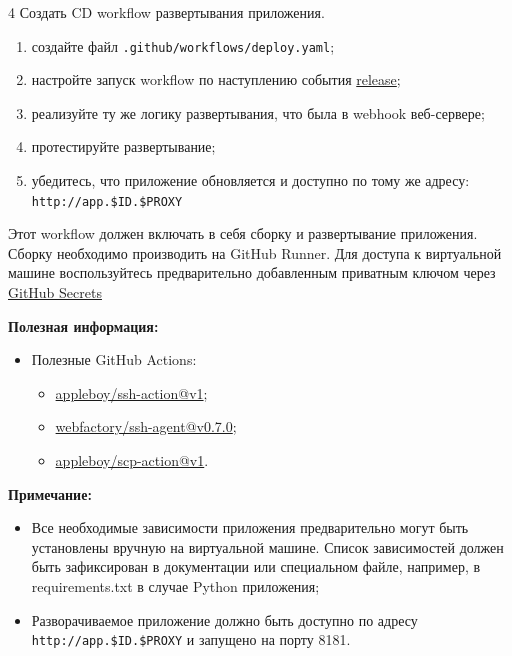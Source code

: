 \documentclass[12pt,a4paper]{article}
\begin{document}
\begin{task}{4}
    Создать CD workflow развертывания приложения.

    \begin{enumerate}
        \item создайте файл \texttt{.github/workflows/deploy.yaml};
        \item настройте запуск workflow по наступлению события \href{https://docs.github.com/en/actions/reference/workflows-and-actions/events-that-trigger-workflows#release}{release};
        \item реализуйте ту же логику развертывания, что была в webhook веб-сервере;
        \item протестируйте развертывание;
        \item убедитесь, что приложение обновляется и доступно по тому же адресу: \texttt{http://app.\$ID.\$PROXY}
    \end{enumerate}

    Этот workflow должен включать в себя сборку и развертывание приложения.
    Сборку необходимо производить на GitHub Runner.
    Для доступа к виртуальной машине воспользуйтесь предварительно добавленным приватным ключом через \href{https://docs.github.com/ru/actions/how-tos/write-workflows/choose-what-workflows-do/use-secrets}{GitHub Secrets}

    \textbf{Полезная информация:}
    \begin{itemize}
        \item Полезные GitHub Actions:
        \begin{itemize}
            \item \href{https://github.com/appleboy/ssh-action}{appleboy/ssh-action@v1};
            \item \href{https://github.com/webfactory/ssh-agent}{webfactory/ssh-agent@v0.7.0};
            \item \href{https://github.com/appleboy/scp-action}{appleboy/scp-action@v1}.
        \end{itemize}
    \end{itemize}
    
    \textbf{Примечание:}
    \begin{itemize}
        \item Все необходимые зависимости приложения предварительно могут быть установлены вручную на виртуальной машине.
        Список зависимостей должен быть зафиксирован в документации или специальном файле, например, в requirements.txt в случае Python приложения;
        \item Разворачиваемое приложение должно быть доступно по адресу \texttt{http://app.\$ID.\$PROXY} и запущено на порту 8181.
    \end{itemize}
\end{task}
\end{document}

